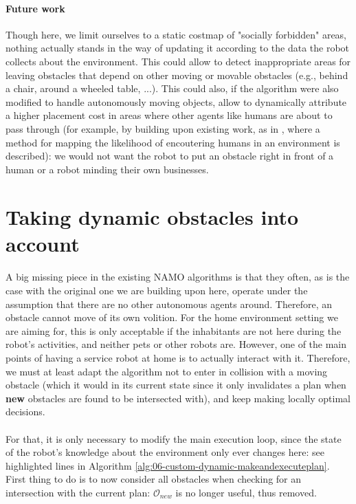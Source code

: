 \paragraph{Future work} Though here, we limit ourselves to a static costmap of "socially forbidden" areas, nothing actually stands in the way of updating it according to the data the robot collects about the environment. This could allow to detect inappropriate areas for leaving obstacles that depend on other moving or movable obstacles (e.g., behind a chair, around a wheeled table, ...). This could also, if the algorithm were also modified to handle autonomously moving objects, allow to dynamically attribute a higher placement cost in areas where other agents like humans are about to pass through (for example, by building upon existing work, as in \parencite{jumel_mapping_2017}, where a method for mapping the likelihood of encoutering humans in an environment is described): we would not want the robot to put an obstacle right in front of a human or a robot minding their own businesses.

\section{Taking dynamic obstacles into account}\label{dynamic_section}

\paragraph{} A big missing piece in the existing NAMO algorithms is that they often, as is the case with the original one we are building upon here, operate under the assumption that there are no other autonomous agents around. Therefore, an obstacle cannot move of its own volition. For the home environment setting we are aiming for, this is only acceptable if the inhabitants are not here during the robot's activities, and neither pets or other robots are. However, one of the main points of having a service robot at home is to actually interact with it. Therefore, we must at least adapt the algorithm not to enter in collision with a moving obstacle (which it would in its current state since it only invalidates a plan when \textbf{new} obstacles are found to be intersected with), and keep making locally optimal decisions.

\paragraph{} For that, it is only necessary to modify the main execution loop, since the state of the robot's knowledge about the environment only ever changes here: see highlighted lines in Algorithm \ref{alg:06-custom-dynamic-makeandexecuteplan}. First thing to do is to now consider all obstacles when checking for an intersection with the current plan: $\mathcal{O}_{new}$ is no longer useful, thus removed.


